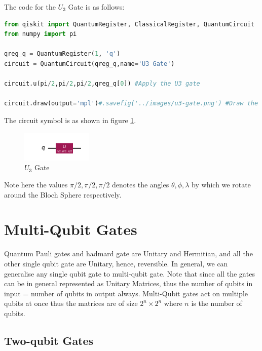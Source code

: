 \documentclass[12pt, oneside]{book}
\theoremstyle{definition}
\theoremstyle{definition}
\theoremstyle{remark}
\begin{document}
The code for the $U_3$ Gate is as follows:
\begin{lstlisting}[language=Python]
from qiskit import QuantumRegister, ClassicalRegister, QuantumCircuit
from numpy import pi

qreg_q = QuantumRegister(1, 'q')
circuit = QuantumCircuit(qreg_q,name='U3 Gate')

circuit.u(pi/2,pi/2,pi/2,qreg_q[0]) #Apply the U3 gate

circuit.draw(output='mpl')#.savefig('../images/u3-gate.png') #Draw the circuit
\end{lstlisting}

The circuit symbol is as shown in figure \ref{fig:u3}.
\begin{figure}[H]
    \centering
    \includegraphics[width=0.3\textwidth]{../images/u3-gate.png}
    \caption{$U_3$ Gate}
    \label{fig:u3}
\end{figure}
Note here the values $\pi/2,\pi/2,\pi/2$ denotes the angles $\theta,\phi,\lambda$ by which we rotate around the Bloch Sphere respectively.

\section{Multi-Qubit Gates}
Quantum Pauli gates and hadmard gate are Unitary and Hermitian, and all the other single qubit gate are Unitary, hence, reversible.
In general, we can generalise any single qubit gate to multi-qubit gate.
Note that since all the gates can be in general represented as Unitary Matrices, thus the number of 
qubits in input = number of qubits in output always. Multi-Qubit gates act on multiple qubits at once thus the matrices are of
size $2^n \times 2^n$ where $n$ is the number of qubits.

\subsection{Two-qubit Gates}
\end{document}
